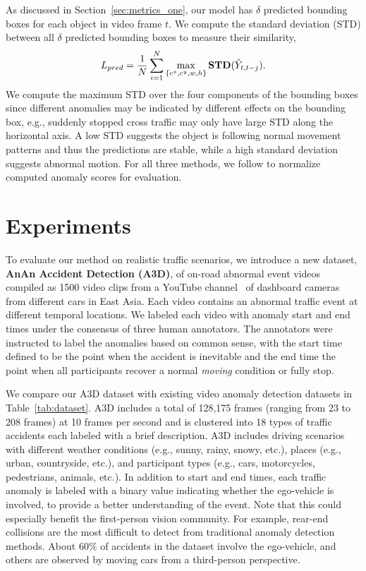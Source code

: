 \documentclass[letterpaper, 10 pt, conference]{ieeeconf}
\theoremstyle{definition}
\theoremstyle{remark}
\begin{document}
As discussed in Section~\ref{sec:metrics_one}, our model has $\delta$
predicted bounding boxes for each object in video frame $t$.
We compute the standard deviation (STD) between all $\delta$
predicted bounding boxes to measure their similarity,
\begin{equation}\label{eq:l_pred}
    L_{pred} = \frac{1}{N}\sum_{i=1}^{N} \max_{\{c^x,c^y,w,h\}} \text{\textbf{STD}}(\hat{Y}_{t,t-j}).
\end{equation}
We compute the maximum STD over the four components of
the bounding boxes since different anomalies may be indicated by
different effects on the bounding box, e.g., suddenly stopped
cross traffic
may only have large STD along the horizontal axis.
A low STD suggests the object is following normal
movement patterns and thus the predictions
are stable, while a high standard deviation suggests abnormal motion.
For all three methods, we follow \cite{liu2018future} to
normalize computed anomaly scores for evaluation.

 \section{Experiments}

To evaluate our method on realistic traffic scenarios, we introduce a
new dataset, \textbf{AnAn Accident Detection (A3D)}, of on-road abnormal 
event videos compiled as 1500 video clips from a YouTube 
channel~\cite{ananxingche} of dashboard cameras from different cars in East Asia.
Each video contains an abnormal traffic event at different temporal
locations. We labeled each video with anomaly start and end times
under the consensus of three human annotators. The
annotators were instructed to label the anomalies based on common sense, with the start
time defined to be the point when the accident is inevitable and the end time the point
when all participants recover a normal \textit{moving} condition or fully stop. 

We compare our A3D dataset with existing video anomaly detection
datasets in Table~\ref{tab:dataset}. A3D includes a total
of 128,175 frames (ranging from 23 to 208 frames)
at 10 frames per second and is clustered into 18 types
of traffic accidents each labeled with a brief description.
A3D includes driving scenarios with different weather conditions
(e.g., sunny, rainy, snowy, etc.), places
(e.g., urban, countryside, etc.), and participant types
(e.g., cars, motorcycles, pedestrians, animals, etc.).
In addition to start and end times, each traffic anomaly is 
labeled with a binary value indicating whether the ego-vehicle is involved,
to provide a better
understanding of the event. Note that this could especially benefit the
first-person vision community. For example, rear-end collisions are
the most difficult to detect from traditional
anomaly detection methods. About $60\%$ of accidents in the dataset involve the
ego-vehicle, and others are observed by moving cars from
a third-person perspective.
\end{document}
